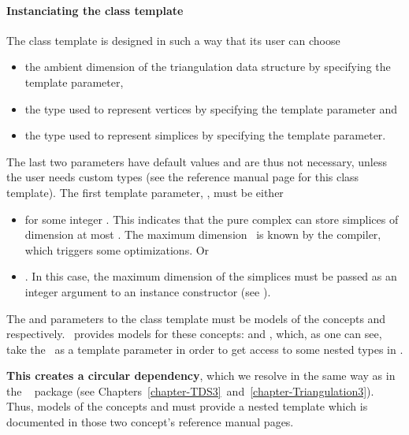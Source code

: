 \paragraph{Instanciating the class template}

The 
class template is designed in such a way that its user can choose
\begin{itemize}
\item the ambient dimension of the triangulation data structure by specifying the  template parameter,
\item the type used to represent vertices by specifying the 
template parameter and
\item the type used to represent simplices by specifying the
 template parameter.
\end{itemize}

The last two parameters have default values and are thus not necessary, unless
the user needs custom types (see the reference manual page for this class
template). The first template parameter, , must be either
\begin{itemize}
\item \ccPureGlobalScope{} for some integer \ad. This
indicates that the pure complex can store simplices of dimension at most
\ad. The maximum dimension \ad\ is known by the compiler, which
triggers some optimizations. Or
\item \ccPureGlobalScope{}. In this case, the maximum
dimension of the simplices must be passed as an integer argument to an instance
constructor (see ).
\end{itemize}

The  and  parameters to the class template
must be models of the concepts  and
 respectively. \cgal\ provides models for these
concepts:  and
, which, as one
can see, take the \tds\ as a template parameter in order to get access to
some nested types in \tds.

\textbf{This creates a circular dependency}, which we resolve in the same way
as in the \cgal\  package (see
Chapters~\ref{chapter-TDS3}~and~\ref{chapter-Triangulation3}).
Thus, models of the concepts  and
 must provide a nested template 
which is documented in those two concept's reference manual pages.

